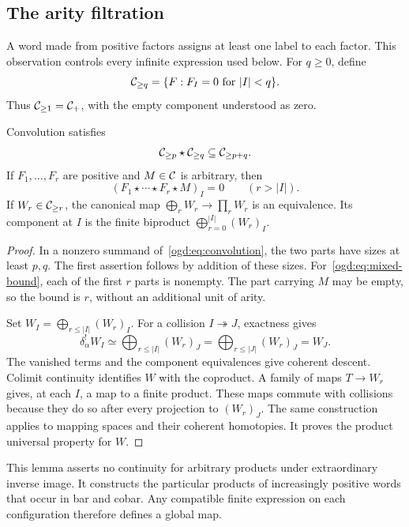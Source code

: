 \subsection{The arity filtration}

A word made from positive factors assigns at least one label to each factor.
This observation controls every infinite expression used below.
For \(q\geq0\), define
\[
 \mathcal C_{\geq q}=\{F:F_I=0\text{ for }|I|<q\}.
\]
Thus \(\mathcal C_{\geq1}=\mathcal C_+\), with the empty component understood as zero.

\begin{lemma}\label{ogd:lem:finite}
Convolution satisfies
\[
 \mathcal C_{\geq p}\star\mathcal C_{\geq q}\subseteq\mathcal C_{\geq p+q}.
\]
If \(F_1,\ldots,F_r\) are positive and \(M\in\mathcal C\) is arbitrary, then
\begin{equation}\label{ogd:eq:mixed-bound}
 (F_1\star\cdots\star F_r\star M)_I=0\qquad(r>|I|).
\end{equation}
If \(W_r\in\mathcal C_{\geq r}\), the canonical map \(\bigoplus_rW_r\to\prod_rW_r\) is an equivalence.
Its component at \(I\) is the finite biproduct \(\bigoplus_{r=0}^{|I|}(W_r)_I\).
\end{lemma}
\begin{proof}
In a nonzero summand of~\eqref{ogd:eq:convolution}, the two parts have sizes at least \(p,q\).
The first assertion follows by addition of these sizes.
For~\eqref{ogd:eq:mixed-bound}, each of the first \(r\) parts is nonempty.
The part carrying \(M\) may be empty, so the bound is \(r\), without an additional unit of arity.

Set \(W_I=\bigoplus_{r\leq|I|}(W_r)_I\).
For a collision \(I\twoheadrightarrow J\), exactness gives
\[
 \delta_\alpha^!W_I\simeq\bigoplus_{r\leq|I|}(W_r)_J
  =\bigoplus_{r\leq|J|}(W_r)_J=W_J.
\]
The vanished terms and the component equivalences give coherent descent.
Colimit continuity identifies \(W\) with the coproduct.
A family of maps \(T\to W_r\) gives, at each \(I\), a map to a finite product.
These maps commute with collisions because they do so after every projection to \((W_r)_J\).
The same construction applies to mapping spaces and their coherent homotopies.
It proves the product universal property for \(W\).
\end{proof}

This lemma asserts no continuity for arbitrary products under extraordinary inverse image.
It constructs the particular products of increasingly positive words that occur in bar and cobar.
Any compatible finite expression on each configuration therefore defines a global map.

